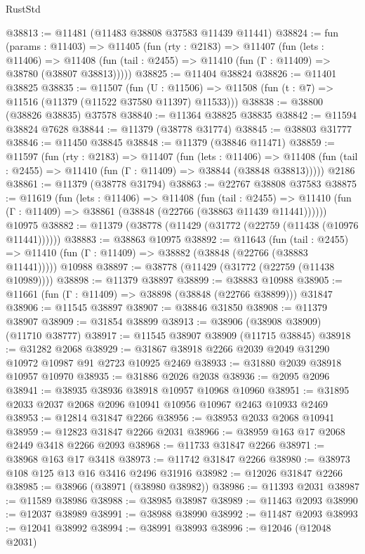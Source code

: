 \begin{lexlean}{RustStd}
\begin{coremodule}
@38813 := @11481 (@11483 @38808 @37583 @11439 @11441)
@38824 := fun (params : @11403) =>
  @11405
    (fun (rty : @2183) =>
    @11407
      (fun (lets : @11406) =>
      @11408 (fun (tail : @2455) => @11410 (fun (Γ : @11409) => @38780 (@38807 @38813)))))
@38825 := @11404 @38824
@38826 := @11401 @38825
@38835 := @11507
    (fun (U : @11506) => @11508 (fun (t : @7) => @11516 (@11379 (@11522 @37580 @11397) @11533)))
@38838 := @38800 (@38826 @38835) @37578
@38840 := @11364 @38825 @38835
@38842 := @11594 @38824 @7628
@38844 := @11379 (@38778 @31774)
@38845 := @38803 @31777
@38846 := @11450 @38845
@38848 := @11379 (@38846 @11471)
@38859 := @11597
    (fun (rty : @2183) =>
    @11407
      (fun (lets : @11406) =>
      @11408 (fun (tail : @2455) => @11410 (fun (Γ : @11409) => @38844 (@38848 @38813)))))
    @2186
@38861 := @11379 (@38778 @31794)
@38863 := @22767 @38808 @37583
@38875 := @11619
    (fun (lets : @11406) =>
    @11408
      (fun (tail : @2455) =>
      @11410 (fun (Γ : @11409) => @38861 (@38848 (@22766 (@38863 @11439 @11441))))))
    @10975
@38882 := @11379 (@38778 (@11429 (@31772 (@22759 (@11438 (@10976 @11441))))))
@38883 := @38863 @10975
@38892 := @11643
    (fun (tail : @2455) => @11410 (fun (Γ : @11409) => @38882 (@38848 (@22766 (@38883 @11441)))))
    @10988
@38897 := @38778 (@11429 (@31772 (@22759 (@11438 @10989))))
@38898 := @11379 @38897
@38899 := @38883 @10988
@38905 := @11661 (fun (Γ : @11409) => @38898 (@38848 (@22766 @38899))) @31847
@38906 := @11545 @38897
@38907 := @38846 @31850
@38908 := @11379 @38907
@38909 := @31854 @38899
@38913 := @38906 (@38908 @38909) (@11710 @38777)
@38917 := @11545 @38907 @38909 (@11715 @38845)
@38918 := @31282 @2068
@38929 := @31867 @38918 @2266 @2039 @2049 @31290 @10972 @10987 @91 @2723 @10925 @2469
@38933 := @31880 @2039 @38918 @10957 @10970
@38935 := @31886 @2026 @2038
@38936 := @2095 @2096
@38941 := @38935 @38936 @38918 @10957 @10968 @10960
@38951 := @31895 @2033 @2037 @2068 @2096 @10941 @10956 @10967 @2463 @10933 @2469
@38953 := @12814 @31847 @2266
@38956 := @38953 @2033 @2068 @10941
@38959 := @12823 @31847 @2266 @2031
@38966 := @38959 @163 @17 @2068 @2449 @3418 @2266 @2093
@38968 := @11733 @31847 @2266
@38971 := @38968 @163 @17 @3418
@38973 := @11742 @31847 @2266
@38980 := @38973 @108 @125 @13 @16 @3416 @2496 @31916
@38982 := @12026 @31847 @2266
@38985 := @38966 (@38971 (@38980 @38982))
@38986 := @11393 @2031
@38987 := @11589 @38986
@38988 := @38985 @38987
@38989 := @11463 @2093
@38990 := @12037 @38989
@38991 := @38988 @38990
@38992 := @11487 @2093
@38993 := @12041 @38992
@38994 := @38991 @38993
@38996 := @12046 (@12048 @2031)

\end{coremodule}
\end{lexlean}
